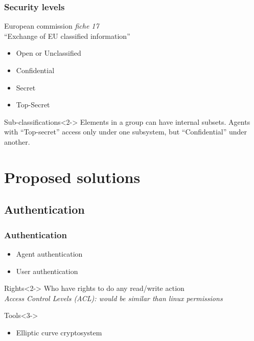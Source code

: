 \documentclass{beamer}
\begin{document}
\begin{frame}
\frametitle{Security levels}
    European commission \emph{fiche 17} \\``Exchange of EU classified information'' \cite{fiche17EU}
    \begin{itemize}
        \item Open or Unclassified
        \item Confidential
        \item Secret
        \item Top-Secret
    \end{itemize}
   \begin{exampleblock}{Sub-classifications}<2->
       Elements in a group can have internal subsets. Agents with ``Top-secret'' access only under one subsystem, but ``Confidential'' under another.
   \end{exampleblock}
\end{frame}

\section{Proposed solutions}


\subsection{Authentication}

\begin{frame}
\frametitle{Authentication}
    \begin{block}{}
        \begin{itemize}
            \item Agent authentication
            \item User authentication
        \end{itemize}
    \end{block}
    \begin{block}{Rights}<2->
         Who have rights to do any read/write action\\
         \emph{Access Control Levels (ACL): would be similar than linux permissions}
    \end{block}
    \begin{alertblock}{Tools}<3->
        \begin{itemize}
            \item Elliptic curve cryptosystem
        \end{itemize}
    \end{alertblock}
\end{frame}
\end{document}
